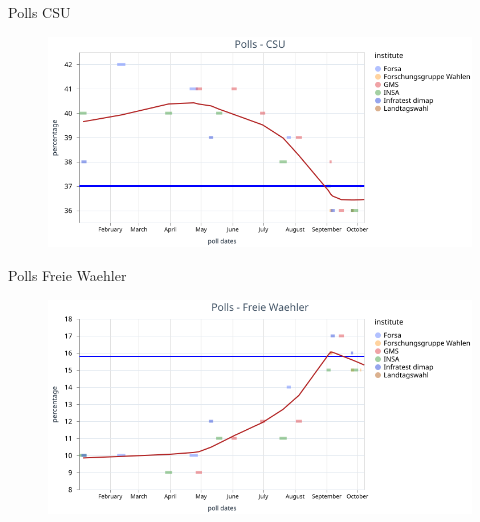 
\begin{frame}{Polls CSU}
	\begin{figure}[htbp]
		\centering
		\includegraphics[width=\linewidth, keepaspectratio]{pictures/paper/polls/visualization_csu_polls.png}
	\end{figure}
\end{frame}

\begin{frame}{Polls Freie Waehler}
	\begin{figure}[htbp]
		\centering
		\includegraphics[width=0.95\linewidth, keepaspectratio]{pictures/paper/polls/visualization_fw_polls.png}
	\end{figure}
\end{frame}